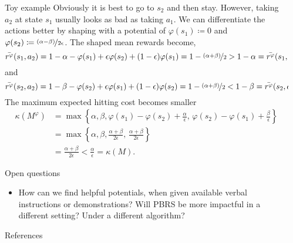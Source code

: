 \documentclass[final]{beamer}
\newlength{\sepwidth}
\newlength{\colwidth}
\newcommand{\separatorcolumn}{\begin{column}{\sepwidth}\end{column}}
\begin{document}
\begin{frame}[t]
\begin{columns}[t]
\begin{column}{\colwidth}
\begin{block}{Toy example}
  Obviously it is best to go to $s_2$ and then stay. However, taking $a_2$ at state $s_1$ usually looks as bad as taking $a_1$. We can differentiate the actions better by shaping with a potential of $\varphi(s_1) \coloneqq 0$ and $\varphi(s_2) \coloneqq \nicefrac{(\alpha - \beta)}{2 \epsilon}$. The shaped mean rewards become, 
  $$ \bar{r^\varphi}(s_1, a_2) = 1 - \alpha - \varphi(s_1) + \epsilon \varphi(s_2) + (1 - \epsilon) \varphi(s_1) = 1 - \nicefrac{(\alpha + \beta)}{2} > 1 - \alpha = \bar{r^\varphi}(s_1, a_1) $$
  and 
  $$ \bar{r^\varphi}(s_2, a_2) = 1 - \beta - \varphi(s_2) + \epsilon \varphi(s_1) + (1 - \epsilon) \varphi(s_2) = 1 - \nicefrac{(\alpha + \beta)}{2} < 1 - \beta = \bar{r^\varphi}(s_2, a_1). $$
  The maximum expected hitting cost becomes smaller
  \begin{align*}
    \kappa(M^\varphi) &= \max \left\{ \alpha, \beta, \varphi(s_1) - \varphi(s_2) + \frac{\alpha}{\epsilon}, \, \varphi(s_2) - \varphi(s_1) + \frac{\beta}{\epsilon} \right\} \\
    &= \max \left\{ \alpha, \beta, \frac{\alpha + \beta}{2 \epsilon}, \, \frac{\alpha + \beta}{2 \epsilon} \right\} \\
    &= \frac{\alpha + \beta}{2 \epsilon} < \frac{\alpha}{\epsilon} = \kappa(M).
  \end{align*}
  \end{block}

  \begin{block}{Open questions}
  \begin{itemize}
      \item How can we find helpful potentials, when given available verbal instructions or demonstrations? Will PBRS be more impactful in a different setting? Under a different algorithm?
  \end{itemize}
  \end{block}

  \begin{block}{References}

    \nocite{*}
    \footnotesize{}

  \end{block}

\end{column}

\separatorcolumn
\end{columns}

\end{frame}
\end{document}
